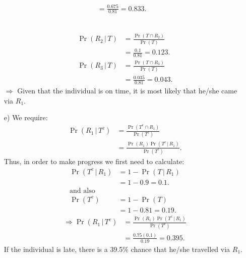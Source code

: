 \documentclass[12pt]{article}
\begin{document}
{\begin{minipage}[t]{0.98\textwidth}
\begin{minipage}[t]{0.47\textwidth}
\begin{enumerate}[a)]
\begin{align*}
               &= \frac{0.675}{0.81} = 0.833.
\end{align*}
\end{enumerate}
\end{minipage}\hspace{0.055\textwidth}
\begin{minipage}[t]{0.47\textwidth}
\begin{enumerate}
\item[] \qquad\\[-1.3cm]
\begin{align*}
\Pr(R_2\,|\,T) &= \frac{\Pr(T \cap R_2)}{\Pr(T)} \\
               &= \frac{0.1}{0.81} = 0.123.\\[0.4cm]
\Pr(R_3\,|\,T) &= \frac{\Pr(T \cap R_3)}{\Pr(T)} \\
               &= \frac{0.035}{0.81} = 0.043.
\end{align*}
$\Rightarrow$ Given that the individual is on time, it is most likely that he/she came via $R_1$.
\item[e)] We require:\\[-0.8cm]
\begin{align*}
\Pr(R_1\,|\,T^c) &= \frac{\Pr(T^c \cap R_1)}{\Pr(T^c)} \\
               &= \frac{\Pr(R_1) \Pr(T^c\,|\,R_1)}{\Pr(T^c)}.
\end{align*}
Thus, in order to make progress we first need to calculate:
\begin{align*}
\Pr(T^c\,|\,R_1) &= 1 - \Pr(T\,|\,R_1) \\ &= 1 - 0.9 = 0.1.\\[0.1cm]
\text{and also}\\[0.2cm]
\Pr(T^c) &= 1 - \Pr(T) \\ &= 1 - 0.81 = 0.19.
\end{align*}
\begin{align*}
\Rightarrow \Pr(R_1\,|\,T^c) &= \frac{\Pr(R_1) \Pr(T^c\,|\,R_1)}{\Pr(T^c)} \\
&= \frac{0.75(0.1)}{0.19} = 0.395.
\end{align*}
If the individual is late, there is a 39.5\% chance that he/she travelled via $R_1$.
\end{enumerate}
\end{minipage}
\end{minipage}}\vspace{0.03\textwidth}
\end{document}

